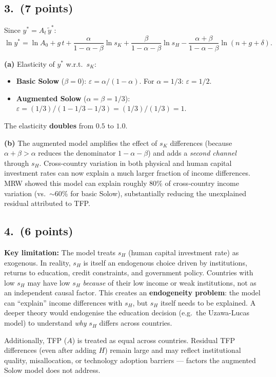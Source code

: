 \documentclass[a4paper,11pt]{article}
\newcommand{\ytilde}{\tilde{y}}
\begin{document}
\subsection*{3.\ (7 points)}

\begin{answerbox}
Since $y^* = A_t\,\ytilde^*$:
\[
    \ln y^* = \ln A_0 + g\,t
    + \frac{\alpha}{1-\alpha-\beta}\ln s_K
    + \frac{\beta}{1-\alpha-\beta}\ln s_H
    - \frac{\alpha+\beta}{1-\alpha-\beta}\ln(n+g+\delta).
\]

\textbf{(a)} Elasticity of $y^*$ w.r.t.\ $s_K$:
\begin{itemize}
    \item \textbf{Basic Solow} ($\beta=0$): $\varepsilon = \alpha/(1-\alpha)$.
    For $\alpha=1/3$: $\varepsilon = 1/2$.
    \item \textbf{Augmented Solow} ($\alpha=\beta=1/3$):
    $\varepsilon = (1/3)/(1-1/3-1/3) = (1/3)/(1/3) = 1$.
\end{itemize}
The elasticity \textbf{doubles} from $0.5$ to $1.0$.

\textbf{(b)} The augmented model amplifies the effect of $s_K$ differences (because
$\alpha+\beta > \alpha$ reduces the denominator $1-\alpha-\beta$) and adds a
\emph{second channel} through $s_H$.  Cross-country variation in both physical and
human capital investment rates can now explain a much larger fraction of income
differences.  MRW showed this model can explain roughly 80\% of cross-country income
variation (vs.\ $\sim$60\% for basic Solow), substantially reducing the unexplained
residual attributed to TFP.
\end{answerbox}

\subsection*{4.\ (6 points)}

\begin{answerbox}
\textbf{Key limitation:} The model treats $s_H$ (human capital investment rate) as
exogenous.  In reality, $s_H$ is itself an endogenous choice driven by institutions,
returns to education, credit constraints, and government policy.  Countries with low
$s_H$ may have low $s_H$ \emph{because} of their low income or weak institutions, not
as an independent causal factor.  This creates an \textbf{endogeneity problem}: the
model can ``explain'' income differences with $s_H$, but $s_H$ itself needs to be
explained.  A deeper theory would endogenise the education decision (e.g.\ the
Uzawa-Lucas model) to understand \emph{why} $s_H$ differs across countries.

Additionally, TFP ($A$) is treated as equal across countries.  Residual TFP differences
(even after adding $H$) remain large and may reflect institutional quality,
misallocation, or technology adoption barriers --- factors the augmented Solow model
does not address.
\end{answerbox}
\end{document}
